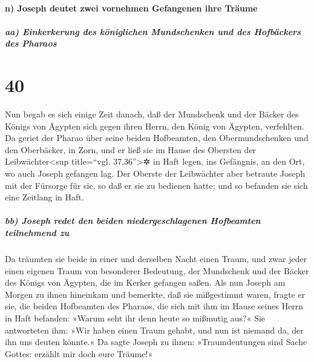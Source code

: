 \hypertarget{n-joseph-deutet-zwei-vornehmen-gefangenen-ihre-truxe4ume}{%
\paragraph{n) Joseph deutet zwei vornehmen Gefangenen ihre
Träume}\label{n-joseph-deutet-zwei-vornehmen-gefangenen-ihre-truxe4ume}}

\hypertarget{aa-einkerkerung-des-kuxf6niglichen-mundschenken-und-des-hofbuxe4ckers-des-pharaos}{%
\subparagraph{aa) Einkerkerung des königlichen Mundschenken und des
Hofbäckers des
Pharaos}\label{aa-einkerkerung-des-kuxf6niglichen-mundschenken-und-des-hofbuxe4ckers-des-pharaos}}

\hypertarget{section-39}{%
\section{40}\label{section-39}}

 Nun begab es sich einige Zeit danach, daß der Mundschenk
und der Bäcker des Königs von Ägypten sich gegen ihren Herrn, den König
von Ägypten, verfehlten.  Da geriet der Pharao über seine
beiden Hofbeamten, den Obermundschenken und den Oberbäcker, in Zorn,
 und er ließ sie im Hause des Obersten der
Leibwächter\textless sup title=``vgl. 37,36''\textgreater✲ in Haft
legen, ins Gefängnis, an den Ort, wo auch Joseph gefangen lag.
 Der Oberste der Leibwächter aber betraute Joseph mit der
Fürsorge für sie, so daß er sie zu bedienen hatte; und so befanden sie
sich eine Zeitlang in Haft.

\hypertarget{bb-joseph-redet-den-beiden-niedergeschlagenen-hofbeamten-teilnehmend-zu}{%
\subparagraph{bb) Joseph redet den beiden niedergeschlagenen Hofbeamten
teilnehmend
zu}\label{bb-joseph-redet-den-beiden-niedergeschlagenen-hofbeamten-teilnehmend-zu}}

 Da träumten sie beide in einer und derselben Nacht einen
Traum, und zwar jeder einen eigenen Traum von besonderer Bedeutung, der
Mundschenk und der Bäcker des Königs von Ägypten, die im Kerker gefangen
saßen.  Als nun Joseph am Morgen zu ihnen hineinkam und
bemerkte, daß sie mißgestimmt waren,  fragte er sie, die
beiden Hofbeamten des Pharaos, die sich mit ihm im Hause seines Herrn in
Haft befanden: »Warum seht ihr denn heute so mißmutig aus?«
 Sie antworteten ihm: »Wir haben einen Traum gehabt, und
nun ist niemand da, der ihn uns deuten könnte.« Da sagte Joseph zu
ihnen: »Traumdeutungen sind Sache Gottes: erzählt mir doch eure Träume!«

